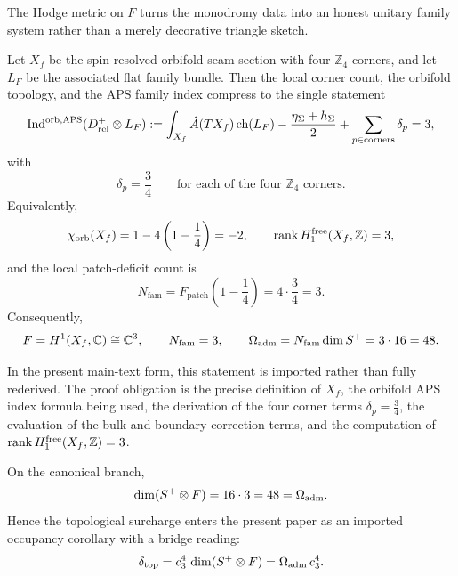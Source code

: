 The Hodge metric on $F$ turns the monodromy data into an honest unitary family system rather than a merely decorative triangle sketch.

\begin{theorem}
\label{thm:orbifold-aps-family-master}
Let $X_f$ be the spin-resolved orbifold seam section with four $\mathbb Z_4$ corners, and let $L_F$ be the associated flat family bundle. Then the local corner count, the orbifold topology, and the APS family index compress to the single statement
\begin{equation}
\label{eq:orbifold-aps-family-master}
\operatorname{Ind}^{\mathrm{orb,APS}}(D_{\mathrm{rel}}^+\otimes L_F)
:=
\int_{X_f}\hat A(TX_f)\,\mathrm{ch}(L_F)
-\frac{\eta_\Sigma+h_\Sigma}{2}
+\sum_{p\in\mathrm{corners}}\delta_p
=3,
\end{equation}
with
\[
\delta_p=\frac34
\qquad
\text{for each of the four }\mathbb Z_4\text{ corners.}
\]
Equivalently,
\[
\chi_{\mathrm{orb}}(X_f)=1-4\left(1-\frac14\right)=-2,
\qquad
\operatorname{rank} H^{\mathrm{free}}_1(X_f,\mathbb Z)=3,
\]
and the local patch-deficit count is
\begin{equation}
\label{eq:family-patch-deficit}
N_{\mathrm{fam}}=F_{\mathrm{patch}}\!\left(1-\frac14\right)=4\cdot\frac34=3.
\end{equation}
Consequently,
\[
F=H^1(X_f,\mathbb C)\cong\mathbb C^3,
\qquad
N_{\mathrm{fam}}=3,
\qquad
\Omega_{\mathrm{adm}}=N_{\mathrm{fam}}\dim S^+=3\cdot 16=48.
\]
\end{theorem}

\begin{remark}
In the present main-text form, this statement is imported rather than fully rederived. The proof obligation is the precise definition of $X_f$, the orbifold APS index formula being used, the derivation of the four corner terms $\delta_p=\frac34$, the evaluation of the bulk and boundary correction terms, and the computation of $\operatorname{rank} H_1^{\mathrm{free}}(X_f,\mathbb Z)=3$.
\end{remark}

\begin{corollary}
\label{cor:boundary-bulk-occupancy}
On the canonical branch,
\[
\dim(S^+\otimes F)=16\cdot 3=48=\Omega_{\mathrm{adm}}.
\]
Hence the topological surcharge enters the present paper as an imported occupancy corollary with a bridge reading:
\[
\delta_{\mathrm{top}}
=
c_3^4\,\dim(S^+\otimes F)
=
\Omega_{\mathrm{adm}}\,c_3^4.
\]
\end{corollary}


